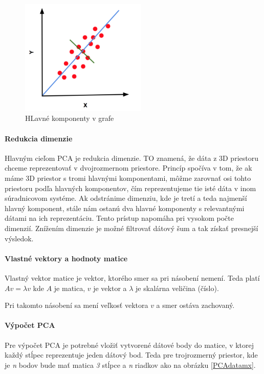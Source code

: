 \begin{figure}[H]
  \centering
  \includegraphics[width=6cm]{img/PCAgraph.png}
  \caption{HLavné komponenty v grafe \cite{c21}}
  \label{PCAgraph}
\end{figure}

\paragraph{Redukcia dimenzie}
Hlavným cieľom PCA je redukcia dimenzie. TO znamená, že dáta z 3D priestoru chceme reprezentovať v dvojrozmernom priestore. Princíp spočíva v tom, že ak máme  3D priestor s tromi hlavnými komponentami, môžme zarovnať osi tohto priestoru podľa hlavných komponentov, čím reprezentujeme tie isté dáta v inom súradnicovom systéme. Ak odstránime dimenziu, kde je tretí a teda najmenší hlavný komponent, stále nám ostanú dva hlavné komponenty s relevantnými dátami na ich reprezentáciu. Tento prístup napomáha pri vysokom počte dimenzií. Znížením dimenzie je možné filtrovať dátový šum a tak získať presnejší výsledok. 

\paragraph{Vlastné vektory a hodnoty matice}
Vlastný vektor matice je vektor, ktorého smer sa pri násobení nemení. 
Teda platí $ Av = \lambda v $ kde $A$ je matica,  $v$ je vektor a  $\lambda$ je skalárna veličina (číslo).

Pri takomto násobení sa mení veľkosť vektora $v$ a smer ostáva zachovaný.

\paragraph{Výpočet PCA}
Pre výpočet PCA je potrebné vložiť vytvorené dátové body do matice, v ktorej každý stĺpec reprezentuje jeden dátový bod. Teda pre trojrozmerný priestor, kde je \textit{n} bodov bude mať matica \textit{3} stĺpce a \textit{n} riadkov ako na obrázku \ref{PCAdatamx}. 

